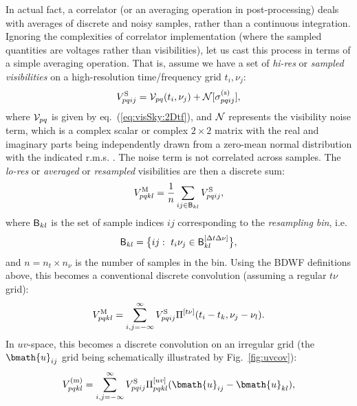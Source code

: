 \documentclass[useAMS,usenatbib]{mn2e}
\begin{document}
In actual fact, a correlator (or an averaging operation in post-processing) deals with averages of discrete and noisy
samples, rather than a continuous integration. Ignoring the complexities of correlator implementation (where the sampled
quantities are voltages rather than visibilities), let us cast this process in terms of a simple averaging operation.
That is, assume we have a set of \emph{hi-res} or \emph{sampled visibilities} on a high-resolution time/frequency grid
$t_i,\nu_j$:
\begin{equation}
\label{eq:sampling}
V^\mathrm{S}_{pqij} = \mathcal{V}_{pq}(t_i,\nu_j) + \mathcal{N}[\sigma^\mathrm{(s)}_{pqij}],
\end{equation}
where $\mathcal{V}_{pq}$ is given by eq.~(\ref{eq:visSky:2Dtf}), and $\mathcal{N}$ represents the visibility noise term, which is
a complex scalar or complex $2\times2$ matrix with the real and imaginary parts being independently drawn from a 
zero-mean normal distribution with the indicated r.m.s. \citep{wrobel1999sensitivity}. The noise
term is not correlated across samples.
The \emph{lo-res} or \emph{averaged} or \emph{resampled} visibilities are then a discrete sum:
\begin{equation}
\label{eq:discrete:tf0}
V^\mathrm{M}_{pqkl} = \frac{1}{n} \sum_{ij\in\mathsf{B}_{kl}}  V^\mathrm{S}_{pqij},
\end{equation}
where $\mathsf{B}_{kl}$ is the set of sample indices $ij$ corresponding to the \emph{resampling bin}, i.e.
\begin{equation}
\mathsf{B}_{kl} = \big \{ ij:~t_i\nu_j \in \mathsf{B}^{[\Delta t\Delta\nu]}_{kl} \big \},
\end{equation}
and $n = n_t\times n_\nu$ is the number of samples in the bin. 
Using the BDWF definitions above, this becomes a conventional discrete convolution (assuming a regular 
$t\nu$ grid):
\begin{equation}
\label{eq:discrete:tf}
V^\mathrm{M}_{pqkl} = \sum_{i,j=-\infty}^{\infty}  V^\mathrm{S}_{pqij} \Pi^{[t\nu]}(t_i-t_k,\nu_j-\nu_l).
\end{equation}
In $uv$-space, this becomes a discrete convolution on an irregular grid (the $\bmath{u}_{ij}$ grid being schematically illustrated by Fig.~\ref{fig:uvcov}):
\begin{equation}
\label{eq:discrete:uv}
V^\mathrm{(m)}_{pqkl} = \sum_{i,j=-\infty}^{\infty}  \Vs_{pqij} \Puv_{pqkl}(\bmath{u}_{ij}-\bmath{u}_{kl}),
\end{equation}
\end{document}
